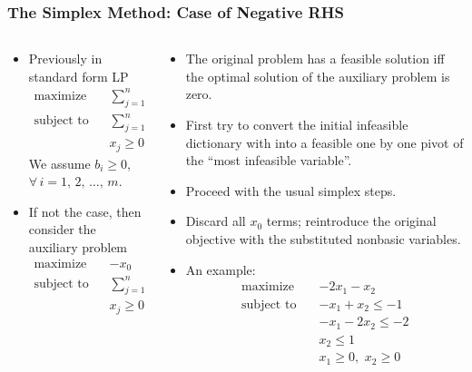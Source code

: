 \documentclass[usenames,dvipsnames,8pt]{beamer}%
\begin{document}
\begin{frame}
  \frametitle{The Simplex Method: Case of Negative RHS}
  \begin{columns}
    \begin{column}{0.5\textwidth}
      \begin{itemize}
        \item Previously in standard form LP 
          \begin{align*}
            \text{maximize}  \quad&\sum_{j=1}^n c_j x_j \\
            \text{subject to}\quad&\sum_{j=1}^n a_{ij}x_j\leqslant b_i,\quad i = 1, 2, \ldots, m\\
                                  &x_j\geqslant 0, \quad j= 1, 2, \ldots, n 
          \end{align*}
          We assume {\color{C2} $b_i\geqslant 0$, $\forall\,i = 1,\,2,\,\ldots,\,m$}.
        \item If not the case, then consider the auxiliary problem
          \begin{align*}
            \text{maximize}  \quad&-x_0 \\
            \text{subject to}\quad&\sum_{j=1}^n a_{ij}x_j - x_0\leqslant b_i,\quad i = 1, 2, \ldots, m\\
                                  &x_j\geqslant 0, \quad j= 0, 1, 2, \ldots, n 
          \end{align*}
      \end{itemize}
    \end{column}
    \hspace{-7mm}
    \begin{column}{0.5\textwidth}
      \begin{itemize}
        \item The original problem has a feasible solution iff the optimal solution of the auxiliary problem is zero.
        \item First try to convert the initial infeasible dictionary with into a feasible one by one pivot of the ``most infeasible variable''.
        \item Proceed with the usual simplex steps.
        \item Discard all $x_0$ terms; reintroduce the original objective with the substituted nonbasic variables.
        \item An example: 
          \begin{align*}
            \text{maximize}\quad    &-2 x_1 - x_2\\
            \text{subject to}\quad  &-x_1 + x_2 \leqslant -1\\
                                    &-x_1 - 2 x_2 \leqslant -2\\
                                    &x_2 \leqslant 1\\
                                    &x_1\geqslant 0,\,\,x_2\geqslant 0
          \end{align*}
      \end{itemize}
    \end{column}
  \end{columns}
\end{frame}
\end{document}
